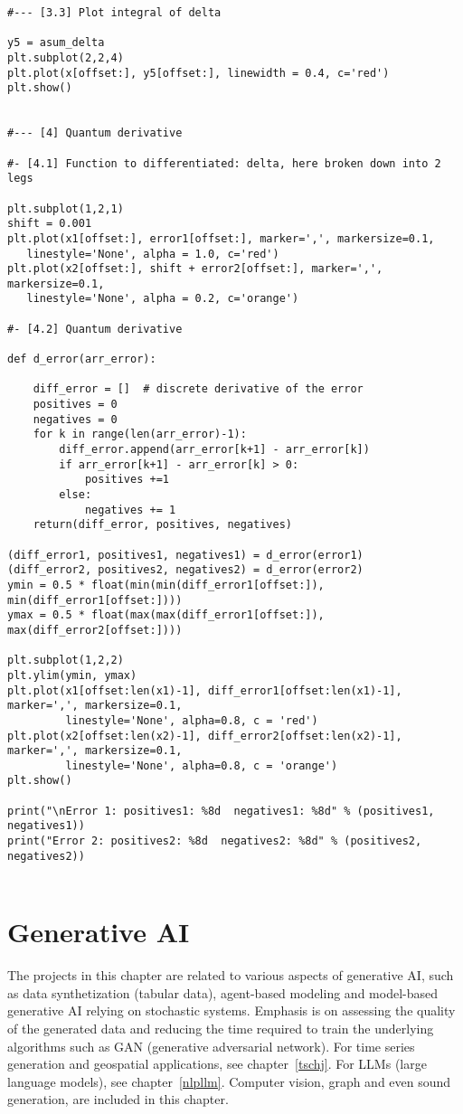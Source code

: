 \documentclass[oneside,10pt]{book}
\begin{document}
\begin{lstlisting}
#--- [3.3] Plot integral of delta

y5 = asum_delta
plt.subplot(2,2,4)
plt.plot(x[offset:], y5[offset:], linewidth = 0.4, c='red')
plt.show()


#--- [4] Quantum derivative

#- [4.1] Function to differentiated: delta, here broken down into 2 legs

plt.subplot(1,2,1)
shift = 0.001
plt.plot(x1[offset:], error1[offset:], marker=',', markersize=0.1, 
   linestyle='None', alpha = 1.0, c='red')
plt.plot(x2[offset:], shift + error2[offset:], marker=',', markersize=0.1, 
   linestyle='None', alpha = 0.2, c='orange')

#- [4.2] Quantum derivative

def d_error(arr_error):

    diff_error = []  # discrete derivative of the error
    positives = 0
    negatives = 0
    for k in range(len(arr_error)-1):
        diff_error.append(arr_error[k+1] - arr_error[k])
        if arr_error[k+1] - arr_error[k] > 0: 
            positives +=1
        else:
            negatives += 1
    return(diff_error, positives, negatives)

(diff_error1, positives1, negatives1) = d_error(error1)
(diff_error2, positives2, negatives2) = d_error(error2)
ymin = 0.5 * float(min(min(diff_error1[offset:]), min(diff_error1[offset:])))
ymax = 0.5 * float(max(max(diff_error1[offset:]), max(diff_error2[offset:])))

plt.subplot(1,2,2)
plt.ylim(ymin, ymax)
plt.plot(x1[offset:len(x1)-1], diff_error1[offset:len(x1)-1], marker=',', markersize=0.1, 
         linestyle='None', alpha=0.8, c = 'red')
plt.plot(x2[offset:len(x2)-1], diff_error2[offset:len(x2)-1], marker=',', markersize=0.1, 
         linestyle='None', alpha=0.8, c = 'orange')
plt.show()

print("\nError 1: positives1: %8d  negatives1: %8d" % (positives1, negatives1)) 
print("Error 2: positives2: %8d  negatives2: %8d" % (positives2, negatives2)) 


\end{lstlisting}


\chapter{Generative AI}

The projects in this chapter are related to various aspects of generative AI, such as data synthetization (tabular data), agent-based modeling and model-based generative AI relying on stochastic systems. Emphasis is on assessing the quality of the generated data and reducing the time required to train the underlying algorithms such as GAN (generative adversarial network). For time series generation and geospatial applications, see chapter~\ref{tschj}. 
For LLMs (large language models), see chapter~\ref{nlpllm}.  Computer vision, graph and even sound generation, are included in this chapter.
   
\end{document}
